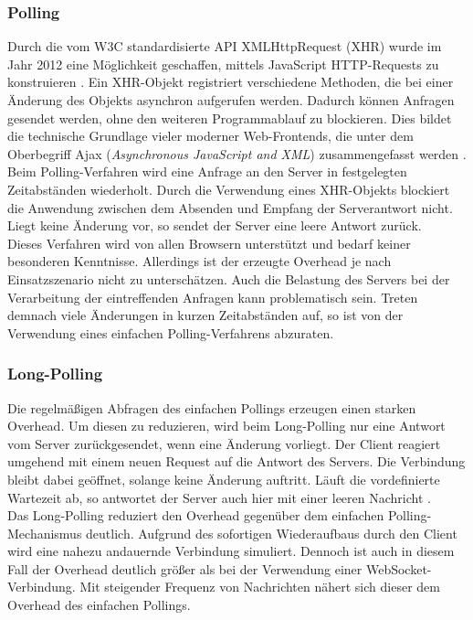 \documentclass[11pt,a4paper,titlepage]{scrartcl}
\numberwithin{equation}{section}
\begin{document}
\subsubsection{Polling}
Durch die vom W3C standardisierte API XMLHttpRequest (XHR) wurde im Jahr 2012 eine Möglichkeit geschaffen, mittels JavaScript HTTP-Requests zu konstruieren \autocite{whatwg_xmlhttprequest_2006}. Ein XHR-Objekt registriert verschiedene Methoden, die bei einer Änderung des Objekts asynchron aufgerufen werden. Dadurch können Anfragen gesendet werden, ohne den weiteren Programmablauf zu blockieren. Dies bildet die technische Grundlage vieler moderner Web-Frontends, die unter dem Oberbegriff Ajax (\textit{Asynchronous JavaScript and XML}) zusammengefasst werden \autocite[26]{gorski_websockets_2015}. \\

\noindent Beim Polling-Verfahren wird eine Anfrage an den Server in festgelegten Zeitabständen wiederholt. Durch die Verwendung eines XHR-Objekts blockiert die Anwendung zwischen dem Absenden und Empfang der Serverantwort nicht. Liegt keine Änderung vor, so sendet der Server eine leere Antwort zurück. \\

\noindent Dieses Verfahren wird von allen Browsern unterstützt und bedarf keiner besonderen Kenntnisse. Allerdings ist der erzeugte Overhead je nach Einsatzszenario nicht zu unterschätzen. Auch die Belastung des Servers bei der Verarbeitung der eintreffenden Anfragen kann problematisch sein. Treten demnach viele Änderungen in kurzen Zeitabständen auf, so ist von der Verwendung eines einfachen Polling-Verfahrens abzuraten.

\subsubsection{Long-Polling}\label{subsubsec:Long-Polling}
Die regelmäßigen Abfragen des einfachen Pollings erzeugen einen starken Overhead. Um diesen zu reduzieren, wird beim Long-Polling nur eine Antwort vom Server zurückgesendet, wenn eine Änderung vorliegt. Der Client reagiert umgehend mit einem neuen Request auf die Antwort des Servers. Die Verbindung bleibt dabei geöffnet, solange keine Änderung auftritt. Läuft die vordefinierte Wartezeit ab, so antwortet der Server auch hier mit einer leeren Nachricht \autocite[29]{gorski_websockets_2015}. \\

\noindent Das Long-Polling reduziert den Overhead gegenüber dem einfachen Polling-Mechanismus deutlich. Aufgrund des sofortigen Wiederaufbaus durch den Client wird eine nahezu andauernde Verbindung simuliert. Dennoch ist auch in diesem Fall der Overhead deutlich größer als bei der Verwendung einer WebSocket-Verbindung. Mit steigender Frequenz von Nachrichten nähert sich dieser dem Overhead des einfachen Pollings.
\end{document}
